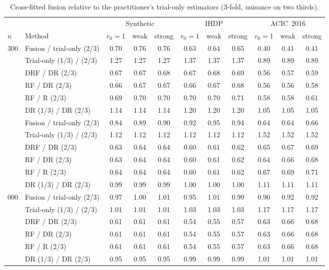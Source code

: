 \begin{table}[h]
\caption{Cross-fitted fusion relative to the practitioner's trial-only estimators (3-fold, nuisance on two thirds).}
\label{tab:crossfit}
\begin{center}\footnotesize
\begin{tabular}{@{}llccccccccc@{}}
\toprule
& & \multicolumn{3}{c}{Synthetic} & \multicolumn{3}{c}{IHDP} & \multicolumn{3}{c}{ACIC~2016}\\
\cmidrule(lr){3-5}\cmidrule(lr){6-8}\cmidrule(lr){9-11}
$n$ & Method & $r_0{=}1$ & weak & strong & $r_0{=}1$ & weak & strong & $r_0{=}1$ & weak & strong\\
\midrule
300 & Fusion / trial-only (2/3) & 0.70 & 0.76 & 0.76 & 0.63 & 0.64 & 0.65 & 0.40 & 0.41 & 0.41 \\
 & Trial-only (1/3) / (2/3) & 1.27 & 1.27 & 1.27 & 1.37 & 1.37 & 1.37 & 0.89 & 0.89 & 0.89 \\
 & DRF / DR (2/3) & 0.67 & 0.67 & 0.68 & 0.67 & 0.68 & 0.69 & 0.56 & 0.57 & 0.59 \\
 & RF / DR (2/3) & 0.66 & 0.67 & 0.67 & 0.66 & 0.67 & 0.68 & 0.56 & 0.56 & 0.58 \\
 & RF / R (2/3) & 0.69 & 0.70 & 0.70 & 0.70 & 0.70 & 0.71 & 0.58 & 0.58 & 0.61 \\
 & DR (1/3) / DR (2/3) & 1.14 & 1.14 & 1.14 & 1.20 & 1.20 & 1.20 & 1.05 & 1.05 & 1.05 \\
\addlinespace
900 & Fusion / trial-only (2/3) & 0.84 & 0.89 & 0.90 & 0.92 & 0.95 & 0.94 & 0.64 & 0.64 & 0.66 \\
 & Trial-only (1/3) / (2/3) & 1.12 & 1.12 & 1.12 & 1.12 & 1.12 & 1.12 & 1.52 & 1.52 & 1.52 \\
 & DRF / DR (2/3) & 0.63 & 0.64 & 0.64 & 0.60 & 0.61 & 0.62 & 0.65 & 0.67 & 0.69 \\
 & RF / DR (2/3) & 0.63 & 0.64 & 0.64 & 0.60 & 0.61 & 0.62 & 0.64 & 0.66 & 0.68 \\
 & RF / R (2/3) & 0.64 & 0.64 & 0.64 & 0.60 & 0.61 & 0.62 & 0.67 & 0.69 & 0.71 \\
 & DR (1/3) / DR (2/3) & 0.99 & 0.99 & 0.99 & 1.00 & 1.00 & 1.00 & 1.11 & 1.11 & 1.11 \\
\addlinespace
3{,}000 & Fusion / trial-only (2/3) & 0.97 & 1.00 & 1.01 & 0.95 & 1.01 & 0.99 & 0.90 & 0.92 & 0.92 \\
 & Trial-only (1/3) / (2/3) & 1.01 & 1.01 & 1.01 & 1.03 & 1.03 & 1.03 & 1.17 & 1.17 & 1.17 \\
 & DRF / DR (2/3) & 0.61 & 0.61 & 0.61 & 0.54 & 0.55 & 0.57 & 0.63 & 0.66 & 0.68 \\
 & RF / DR (2/3) & 0.61 & 0.61 & 0.61 & 0.54 & 0.55 & 0.57 & 0.63 & 0.66 & 0.68 \\
 & RF / R (2/3) & 0.61 & 0.61 & 0.61 & 0.54 & 0.55 & 0.57 & 0.63 & 0.66 & 0.68 \\
 & DR (1/3) / DR (2/3) & 0.95 & 0.95 & 0.95 & 0.99 & 0.99 & 0.99 & 1.01 & 1.01 & 1.01 \\
\bottomrule
\end{tabular}
\end{center}
\end{table}
